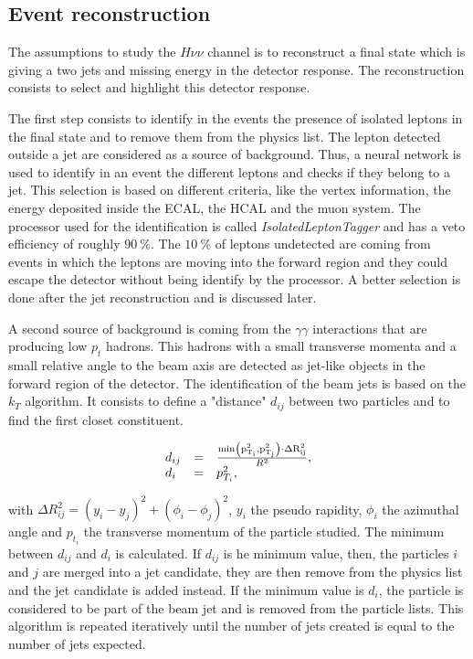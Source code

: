     \subsection{Event reconstruction}

    The assumptions to study the $H \nu\nu$ channel is to reconstruct a final state which is giving a two jets and missing energy in the detector response.
    The reconstruction consists to select and highlight this detector response.

    The first step consists to identify in the events the presence of isolated leptons in the final state and to remove them from the physics list.
    The lepton detected outside a jet are considered as a source of background.
    Thus, a neural network is used to identify in an event the different leptons and checks if they belong to a jet.
    This selection is based on different criteria, like the vertex information, the energy deposited inside the \gls{ECAL}, the \gls{HCAL} and the muon system. 
    The processor used for the identification is called \textit{IsolatedLeptonTagger} and has a veto efficiency of roughly $90~\%$.
    The $10~\%$ of leptons undetected are coming from events in which the leptons are moving into the forward region and they could escape the detector without being identify by the processor.
    A better selection is done after the jet reconstruction and is discussed later.

    A second source of background is coming from the $\gamma \gamma$ interactions that are producing low $p_{t}$ hadrons.
    This hadrons with a small transverse momenta and a small relative angle to the beam axis are detected as jet-like objects in the forward region of the detector.
    The identification of the beam jets is based on the $k_{T}$ algorithm.
    It consists to define a "distance" $d_{ij}$ between two particles and to find the first closet constituent.
    
    \begin{equation}
      \begin{array}{lcl}
        d_{ij} & = & \frac{\rm{min}\left(p^2_{T_i}, p^2_{T_j}\right) \cdot \Delta R^2_{ij}}{R^2}, \\
        d_{i}  & = & p^2_{T_i},
      \end{array}
    \end{equation}

    with $\Delta R^2_{ij} = \left( y_{i} - y_{j}\right)^2 + \left( \phi_{i} - \phi_{j}\right)^2$, $y_{i}$ the pseudo rapidity, $\phi_{i}$ the azimuthal angle and $p_{t_i}$ the transverse momentum of the particle studied.
    The minimum between $d_{ij}$ and $d_{i}$ is calculated.
    If $d_{ij}$ is he minimum value, then, the particles $i$ and $j$ are merged into a jet candidate, they are then remove from the physics list and the jet candidate is added instead.
    If the minimum value is $d_{i}$, the particle is considered to be part of the beam jet and is removed from the particle lists.
    This algorithm is repeated iteratively until the number of jets created is equal to the number of jets expected.
   
